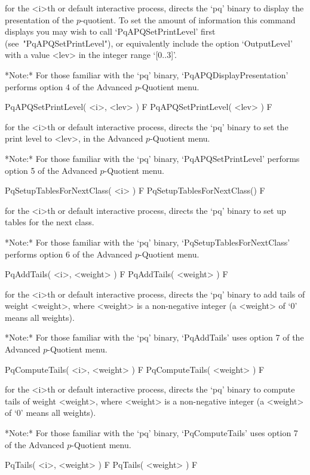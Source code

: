 for the <i>th or default interactive {\ANUPQ} process, directs  the  `pq'
binary to display the presentation of the $p$-quotient. To set the amount
of  information  this   command   displays   you   may   wish   to   call
`PqAPQSetPrintLevel' first  (see~"PqAPQSetPrintLevel"),  or  equivalently
include the option `OutputLevel' with a value <lev> in the integer  range
`[0..3]'.


*Note:*
For those  familiar  with  the  `pq'  binary,  `PqAPQDisplayPresentation'
performs option 4 of the Advanced $p$-Quotient menu.

\>PqAPQSetPrintLevel( <i>, <lev> ) F
\>PqAPQSetPrintLevel( <lev> ) F

for the <i>th or default interactive {\ANUPQ} process, directs  the  `pq'
binary to set the print level to  <lev>,  in  the  Advanced  $p$-Quotient
menu.

*Note:* For those familiar with  the  `pq'  binary,  `PqAPQSetPrintLevel'
performs option 5 of the Advanced $p$-Quotient menu.

\>PqSetupTablesForNextClass( <i> ) F
\>PqSetupTablesForNextClass() F

for the <i>th or default interactive {\ANUPQ} process, directs  the  `pq'
binary to set up tables for the next class.

*Note:* 
For those familiar  with  the  `pq'  binary,  `PqSetupTablesForNextClass'
performs option 6 of the Advanced $p$-Quotient menu.

\>PqAddTails( <i>, <weight> ) F
\>PqAddTails( <weight> ) F

for the <i>th or default interactive {\ANUPQ} process, directs  the  `pq'
binary to add tails of weight <weight>, where <weight> is a  non-negative
integer (a <weight> of `0' means all weights).

*Note:*
For those familiar with the `pq' binary, `PqAddTails' uses  option  7  of
the Advanced $p$-Quotient menu.

\>PqComputeTails( <i>, <weight> ) F
\>PqComputeTails( <weight> ) F

for the <i>th or default interactive {\ANUPQ} process, directs  the  `pq'
binary  to  compute  tails  of  weight  <weight>,  where  <weight>  is  a
non-negative integer (a <weight> of `0' means all weights).

*Note:*
For those familiar with the `pq' binary, `PqComputeTails' uses  option  7
of the Advanced $p$-Quotient menu.

\>PqTails( <i>, <weight> ) F
\>PqTails( <weight> ) F

